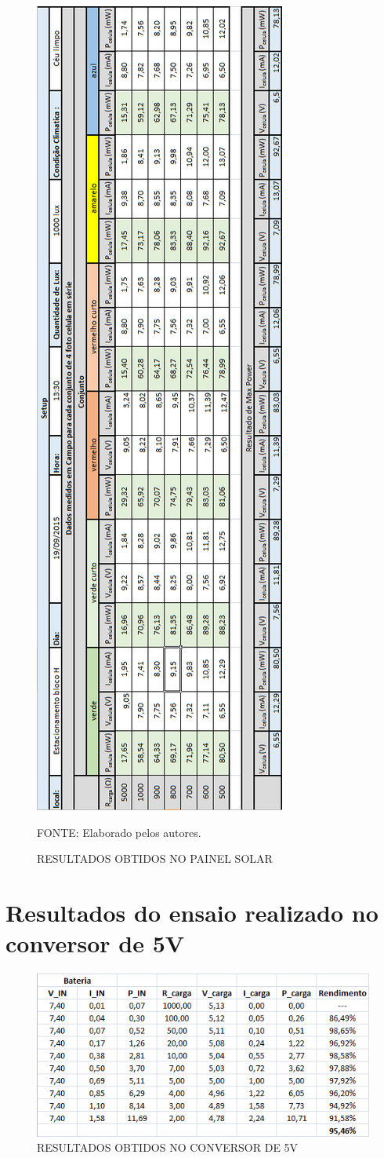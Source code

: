 \documentclass[
	12pt,				%
	openright,			%
	oneside,			%
	a4paper,			%
	english,			%
	french,				%
	spanish,			%
	brazil,				%
	oldfontcommands
	]{abntex2}
\begin{document}
\begin{apendicesenv}
	\begin{figure}[th]
		\caption{RESULTADOS OBTIDOS NO PAINEL SOLAR}
		\centering
		\includegraphics[width=0.35\linewidth]{./anexos/cell4}
		
		\begin{small}
			FONTE: Elaborado pelos autores.
		\end{small}	
	\end{figure}
	
\chapter[Resultados do ensaio realizado no conversor de 5V]{Resultados do ensaio realizado no conversor de 5V}\label{An_rend5}

	\begin{figure}[th]
		\caption{RESULTADOS OBTIDOS NO CONVERSOR DE 5V}
		\centering
		\includegraphics[width=0.75\linewidth]{./anexos/rend5_1}
		

\end{figure}
\end{apendicesenv}
\end{document}

